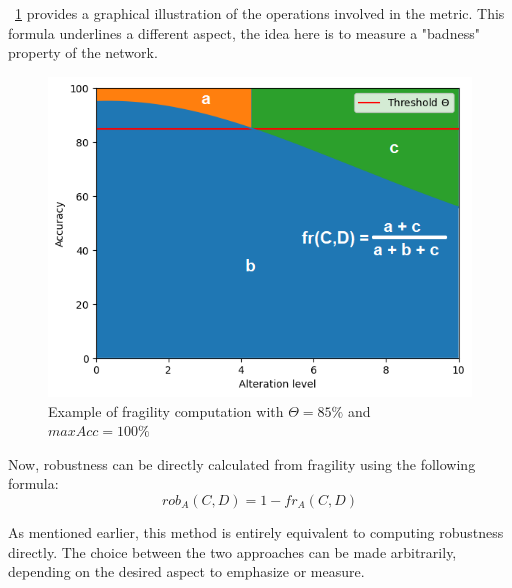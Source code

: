 \Fig~\ref{fig:frag_example} provides a graphical illustration of the operations involved in the metric. This formula underlines a different aspect, the idea here is to measure a "badness" property of the network.

\begin{figure}[h]
	\centering
	\includegraphics[width=0.7\linewidth]{ImageFiles/ANNRob/frag_example}
	\caption{Example of fragility computation with $\Theta=85\%$ and $maxAcc = 100\%$}
	\label{fig:frag_example}
\end{figure}

Now, robustness can be directly calculated from fragility using the following formula:
\[
	rob_A(C,D) = 1 - fr_A(C,D)
\]

As mentioned earlier, this method is entirely equivalent to computing robustness directly. The choice between the two approaches can be made arbitrarily, depending on the desired aspect to emphasize or measure.